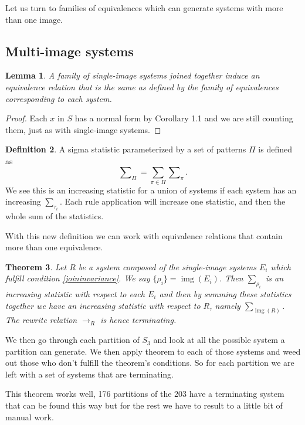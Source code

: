 \documentclass[openany, a4paper, 11pt, english]{article}
\newtheorem{theorem}{Theorem}[section]
\newtheorem{lemma}[theorem]{Lemma}
\theoremstyle{definition}
\newtheorem{definition}[theorem]{Definition}
\newcommand{\Sym}{S}
\DeclareMathOperator{\img}{img}
\begin{document}
Let us turn to families of equivalences which can generate systems with more
than one image.

\subsection{Multi-image systems}
\begin{lemma}
    A family of single-image systems joined together induce an equivalence
    relation that is the same as defined by the family of equivalences
    corresponding to each system.
\end{lemma}
\begin{proof}
    Each $x$ in $\Sym$ has a normal form by Corollary 1.1 and we are still counting
    them, just as with single-image systems.
\end{proof}

\begin{definition}
    A sigma statistic parameterized by a set of patterns $\Pi$ is defined as
    $$
        \sum\nolimits_\Pi = \sum_{\pi \in \Pi} \sum\nolimits_{\pi}.
    $$
    We see this is an increasing statistic for a union of systems if
    each system has an increasing $\sum_{\tau_i}$.  Each rule application will
    increase one statistic, and then the whole sum of the statistics.
\end{definition}

With this new definition we can work with equivalence relations that contain more than one
equivalence.

\begin{theorem}
    Let $R$ be a system composed of the single-image systems $E_i$ which fulfill
    condition \eqref{joininvariance}. We say $\{\rho_i\} = \img(E_i)$. Then
    $\sum\nolimits_{\rho_i}$ is an increasing statistic with respect to each
    $E_i$ and then by summing these statistics together we have an increasing
    statistic with respect to $R$, namely $\sum_{\img(R)}$.  The rewrite
    relation $\to_R$ is hence terminating.
\end{theorem}

We then go through each partition of $\Sym_3$ and look at all the possible
system a partition can generate. We then apply theorem to each of those systems
and weed out those who don't fulfill the theorem's conditions. So for each
partition we are left with a set of systems that are terminating.

This theorem works well, 176 partitions of the 203 have a terminating system
that can be found this way but for the rest we have to result to a little bit of
manual work.
\end{document}
